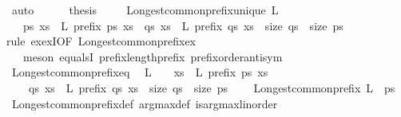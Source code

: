 \begin{isabellebody}
\ auto\isanewline
\ \ \ \ \isamarkupfalse%
\ {\isacharquery}thesis\ \isacommand{{\isachardot}{\isachardot}}\isamarkupfalse%
\isanewline
\ \ \isamarkupfalse%
\isanewline
{}\isamarkupfalse%
%
\endisatagproof
{\isafoldproof}%
%
\isadelimproof
\isanewline
%
\endisadelimproof
\isanewline
{}\isamarkupfalse%
\ Longest{\isacharunderscore}common{\isacharunderscore}prefix{\isacharunderscore}unique{\isacharcolon}\ {\isachardoublequoteopen}L\ {\isasymnoteq}\ {\isacharbraceleft}{\isacharbraceright}\ {\isasymLongrightarrow}\isanewline
\ \ {\isasymexists}{\isacharbang}\ ps{\isachardot}\ {\isacharparenleft}{\isasymforall}xs\ {\isasymin}\ L{\isachardot}\ prefix\ ps\ xs{\isacharparenright}\ {\isasymand}\ {\isacharparenleft}{\isasymforall}qs{\isachardot}\ {\isacharparenleft}{\isasymforall}xs\ {\isasymin}\ L{\isachardot}\ prefix\ qs\ xs{\isacharparenright}\ {\isasymlongrightarrow}\ size\ qs\ {\isasymle}\ size\ ps{\isacharparenright}{\isachardoublequoteclose}\isanewline
%
\isadelimproof
%
\endisadelimproof
%
\isatagproof
{}\isamarkupfalse%
{\isacharparenleft}rule\ ex{\isacharunderscore}ex{}I{\isacharbrackleft}OF\ Longest{\isacharunderscore}common{\isacharunderscore}prefix{\isacharunderscore}ex{\isacharbrackright}{\isacharsemicolon}\isanewline
\ \ \ meson\ equals{}I\ prefix{\isacharunderscore}length{\isacharunderscore}prefix\ prefix{\isacharunderscore}order{\isachardot}antisym{\isacharparenright}%
\endisatagproof
{\isafoldproof}%
%
\isadelimproof
\isanewline
%
\endisadelimproof
\isanewline
{}\isamarkupfalse%
\ Longest{\isacharunderscore}common{\isacharunderscore}prefix{\isacharunderscore}eq{\isacharcolon}\isanewline
\ {\isachardoublequoteopen}{\isasymlbrakk}\ L\ {\isasymnoteq}\ {\isacharbraceleft}{\isacharbraceright}{\isacharsemicolon}\ \ {\isasymforall}xs\ {\isasymin}\ L{\isachardot}\ prefix\ ps\ xs{\isacharsemicolon}\isanewline
\ \ \ \ {\isasymforall}qs{\isachardot}\ {\isacharparenleft}{\isasymforall}xs\ {\isasymin}\ L{\isachardot}\ prefix\ qs\ xs{\isacharparenright}\ {\isasymlongrightarrow}\ size\ qs\ {\isasymle}\ size\ ps\ {\isasymrbrakk}\isanewline
\ \ {\isasymLongrightarrow}\ Longest{\isacharunderscore}common{\isacharunderscore}prefix\ L\ {\isacharequal}\ ps{\isachardoublequoteclose}\isanewline
%
\isadelimproof
%
\endisadelimproof
%
\isatagproof
{}\isamarkupfalse%
\ Longest{\isacharunderscore}common{\isacharunderscore}prefix{\isacharunderscore}def\ arg{\isacharunderscore}max{\isacharunderscore}def\ is{\isacharunderscore}arg{\isacharunderscore}max{\isacharunderscore}linorder\isanewline

\end{isabellebody}
